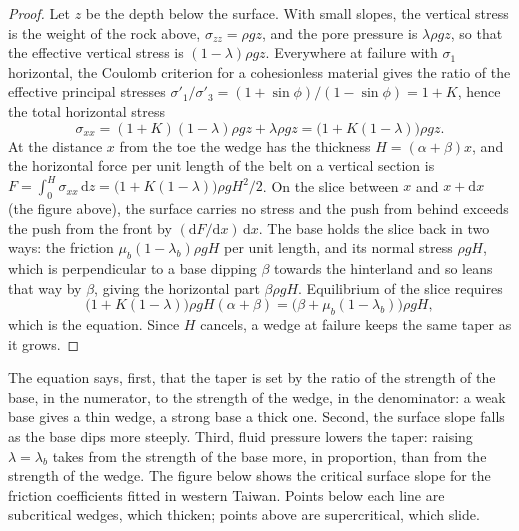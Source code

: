 \begin{proof}
Let $z$ be the depth below the surface. With small slopes, the vertical
stress is the weight of the rock above, $\sigma_{zz} = \rho g z$, and the pore
pressure is $\lambda\rho g z$, so that the effective vertical stress is
$(1 - \lambda)\rho g z$. Everywhere at failure with $\sigma_1$ horizontal,
the Coulomb criterion for a cohesionless material gives the ratio of the
effective principal stresses $\sigma'_1/\sigma'_3 = (1 + \sin\phi)/(1 -
\sin\phi) = 1 + K$, hence the total horizontal stress
\[
  \sigma_{xx} = (1 + K)(1 - \lambda)\rho g z + \lambda\rho g z
  = \bigl(1 + K(1 - \lambda)\bigr)\rho g z .
\]
At the distance $x$ from the toe the wedge has the thickness $H = (\alpha +
\beta)x$, and the horizontal force per unit length of the belt on a vertical
section is $F = \int_0^H \sigma_{xx}\,\mathrm dz = \bigl(1 + K(1 -
\lambda)\bigr)\rho g H^2/2$. On the slice between $x$ and $x + \mathrm dx$
(the figure above), the surface carries no stress and the push from behind
exceeds the push from the front by $(\mathrm dF/\mathrm dx)\,\mathrm dx$.
The base holds the slice back in two ways: the friction $\mu_b(1 -
\lambda_b)\rho g H$ per unit length, and its normal stress $\rho g H$, which
is perpendicular to a base dipping $\beta$ towards the hinterland and so
leans that way by $\beta$, giving the horizontal part $\beta\rho g H$.
Equilibrium of the slice requires
\[
  \bigl(1 + K(1 - \lambda)\bigr)\rho g H(\alpha + \beta)
  = \bigl(\beta + \mu_b(1 - \lambda_b)\bigr)\rho g H ,
\]
which is the equation. Since $H$ cancels, a wedge at failure keeps the same
taper as it grows.
\end{proof}

The equation says, first, that the taper is set by the ratio of the strength
of the base, in the numerator, to the strength of the wedge, in the
denominator: a weak base gives a thin wedge, a strong base a thick one.
Second, the surface slope falls as the base dips more steeply. Third, fluid
pressure lowers the taper: raising $\lambda = \lambda_b$ takes from the
strength of the base more, in proportion, than from the strength of the
wedge. The figure below shows the critical surface slope for the friction
coefficients fitted in western Taiwan. Points below each line are subcritical
wedges, which thicken; points above are supercritical, which slide.

